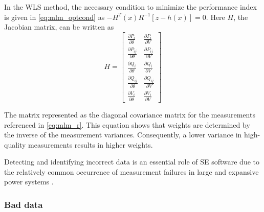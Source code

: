 In the WLS method, the necessary condition to minimize the performance index is given in \ref{eq:mlm_optcond}  as \(-H^{T}(x) R^{-1}[z-h(x)]=0\). Here $H$, the  Jacobian matrix, can be written as
\begin{equation}
H = 
\left[
\begin{array}{cc}
\frac{\partial P_i}{\partial \theta} & \frac{\partial P_i}{\partial V} \\
\frac{\partial P_{ij}}{\partial \theta} & \frac{\partial P_{ij}}{\partial V} \\
\frac{\partial Q_i}{\partial \theta} & \frac{\partial Q_i}{\partial V} \\
\frac{\partial Q_{ij}}{\partial \theta} & \frac{\partial Q_{ij}}{\partial V} \\
\frac{\partial V_i}{\partial \theta} & \frac{\partial V_i}{\partial V}
\end{array}
\right]
\end{equation}

The matrix represented as the diagonal covariance matrix for the measurements referenced in \ref{eq:mlm_r}. This equation shows that weights are determined by the inverse of the measurement variances. Consequently, a lower variance in high-quality measurements results in higher weights.

Detecting and identifying incorrect data is an essential role of SE software due to the relatively common occurrence of measurement failures in large and expansive power systems \autocite{WU199080}.


\subsubsection{Bad data}


